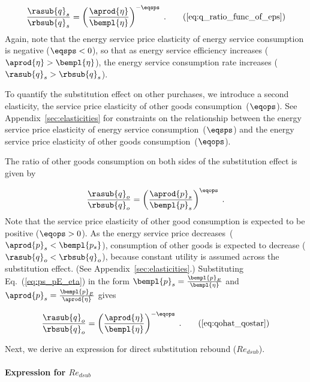 \begin{equation}
  \frac{\rasub{q}_s}{\rbsub{q}_s} = \left( \frac{\aprod{\eta}}{\bempl{\eta}} \right)^{-\eqsps} \; .
                                                                        \tag{\ref{eq:q_ratio_func_of_eps}}
\end{equation}
%
Again, note that the energy service price elasticity of energy service consumption
is negative ($\eqsps < 0$), so that
as energy service efficiency increases ($\aprod{\eta} > \bempl{\eta}$),
the energy service consumption rate increases ($\rasub{q}_s > \rbsub{q}_s$).

To quantify the substitution effect on other purchases,
we introduce a second elasticity, 
the service price elasticity of other goods consumption~($\eqops$).
See Appendix~\ref{sec:elasticities} for constraints on the relationship between the
energy service price elasticity of energy service consumption~($\eqsps$) and the
energy service price elasticity of other goods consumption~($\eqops$).

The ratio of other goods consumption on both sides of the substitution effect is given by

\begin{equation}
  \frac{\rasub{q}_o}{\rbsub{q}_o} = \left( \frac{\aprod{p}_s}{\bempl{p}_s} \right) ^ {\eqops} \; . 
\end{equation}
%
Note that the service price elasticity of other good consumption
is expected to be positive ($\eqops > 0$).
As the energy service price decreases~($\aprod{p}_s < \bempl{p_s}$), 
consumption of other goods is expected to decrease ($\rasub{q}_o < \rbsub{q}_o$), 
because constant utility is assumed across the substitution effect.
(See Appendix~\ref{sec:elasticities}.)
Substituting Eq.~(\ref{eq:ps_pE_eta}) in the form
$\bempl{p}_s = \frac{\bempl{p}_E}{\bempl{\eta}}$ and
$\aprod{p}_s = \frac{\bempl{p}_E}{\aprod{\eta}}$
gives

\begin{equation}
  \frac{\rasub{q}_o}{\rbsub{q}_o} = \left( \frac{\aprod{\eta}}{\bempl{\eta}} \right) ^ {-\eqops} \; . 
                                                                                              \tag{\ref{eq:qohat_qostar}}
\end{equation}

Next, we derive an expression for direct substitution rebound ($Re_{dsub}$).


\paragraph{Expression for $Re_{dsub}$}
\label{sec:Re_dsub}

